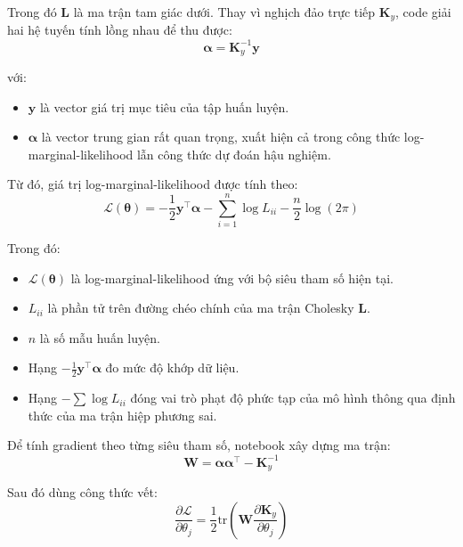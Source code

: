 Trong đó $\mathbf{L}$ là ma trận tam giác dưới. Thay vì nghịch đảo trực tiếp $\mathbf{K}_y$, code giải hai hệ tuyến tính lồng nhau để thu được:
\begin{equation}
    \boldsymbol{\alpha} = \mathbf{K}_y^{-1}\mathbf{y}
\end{equation}

với:
\begin{itemize}
    \item $\mathbf{y}$ là vector giá trị mục tiêu của tập huấn luyện.
    \item $\boldsymbol{\alpha}$ là vector trung gian rất quan trọng, xuất hiện cả trong công thức log-marginal-likelihood lẫn công thức dự đoán hậu nghiệm.
\end{itemize}

Từ đó, giá trị log-marginal-likelihood được tính theo:
\begin{equation}
    \mathcal{L}(\boldsymbol{\theta}) = -\frac{1}{2}\mathbf{y}^{\top}\boldsymbol{\alpha}
    - \sum_{i=1}^{n}\log L_{ii}
    - \frac{n}{2}\log(2\pi)
\end{equation}

Trong đó:
\begin{itemize}
    \item $\mathcal{L}(\boldsymbol{\theta})$ là log-marginal-likelihood ứng với bộ siêu tham số hiện tại.
    \item $L_{ii}$ là phần tử trên đường chéo chính của ma trận Cholesky $\mathbf{L}$.
    \item $n$ là số mẫu huấn luyện.
    \item Hạng $-\tfrac{1}{2}\mathbf{y}^{\top}\boldsymbol{\alpha}$ đo mức độ khớp dữ liệu.
    \item Hạng $-\sum \log L_{ii}$ đóng vai trò phạt độ phức tạp của mô hình thông qua định thức của ma trận hiệp phương sai.
\end{itemize}

Để tính gradient theo từng siêu tham số, notebook xây dựng ma trận:
\begin{equation}
    \mathbf{W} = \boldsymbol{\alpha}\boldsymbol{\alpha}^{\top} - \mathbf{K}_y^{-1}
\end{equation}

Sau đó dùng công thức vết:
\begin{equation}
    \frac{\partial \mathcal{L}}{\partial \theta_j} = \frac{1}{2}\mathrm{tr}\!\left(\mathbf{W}\frac{\partial \mathbf{K}_y}{\partial \theta_j}\right)
\end{equation}


